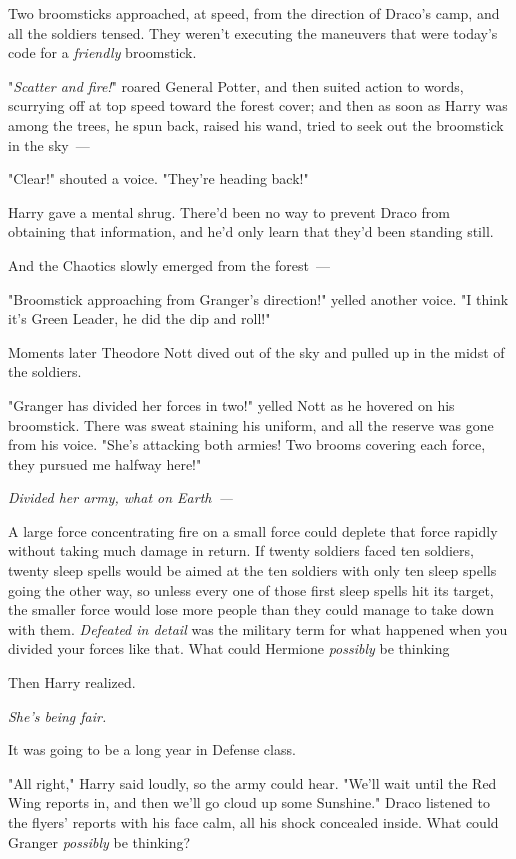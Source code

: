 Two broomsticks approached, at speed, from the direction of Draco's camp, and
all the soldiers tensed. They weren't executing the maneuvers that were today's
code for a \emph{friendly} broomstick.

"\emph{Scatter and fire!}" roared General Potter, and then suited action to
words, scurrying off at top speed toward the forest cover; and then as soon as
Harry was among the trees, he spun back, raised his wand, tried to seek out the
broomstick in the sky~---

"Clear!" shouted a voice. "They're heading back!"

Harry gave a mental shrug. There'd been no way to prevent Draco from obtaining
that information, and he'd only learn that they'd been standing still.

And the Chaotics slowly emerged from the forest~---

"Broomstick approaching from Granger's direction!" yelled another voice. "I
think it's Green Leader, he did the dip and roll!"

Moments later Theodore Nott dived out of the sky and pulled up in the midst of
the soldiers.

"Granger has divided her forces in two!" yelled Nott as he hovered on his
broomstick. There was sweat staining his uniform, and all the reserve was gone
from his voice. "She's attacking both armies! Two brooms covering each force,
they pursued me halfway here!"

\emph{Divided her army, what on Earth~--- }

A large force concentrating fire on a small force could deplete that force
rapidly without taking much damage in return. If twenty soldiers faced ten
soldiers, twenty sleep spells would be aimed at the ten soldiers with only ten
sleep spells going the other way, so unless every one of those first sleep
spells hit its target, the smaller force would lose more people than they could
manage to take down with them. \emph{Defeated in detail} was the military term
for what happened when you divided your forces like that. What could Hermione
\emph{possibly} be thinking{\el}

Then Harry realized.

\emph{She's being fair.}

It was going to be a long year in Defense class.

"All right," Harry said loudly, so the army could hear. "We'll wait until the
Red Wing reports in, and then we'll go cloud up some Sunshine."
\sbreak
Draco listened to the flyers' reports with his face calm, all his shock
concealed inside. What could Granger \emph{possibly} be thinking?

